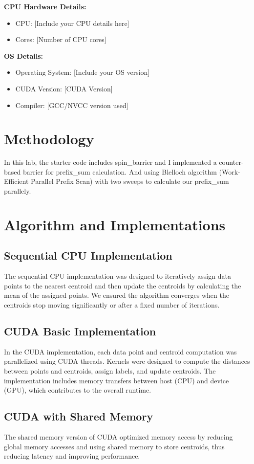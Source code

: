 \documentclass[letterpaper,12pt]{article}
\theoremstyle{remark}
\begin{document}
\textbf{CPU Hardware Details:}
\begin{itemize}
    \item CPU: [Include your CPU details here]
    \item Cores: [Number of CPU cores]
\end{itemize}

\textbf{OS Details:}
\begin{itemize}
    \item Operating System: [Include your OS version]
    \item CUDA Version: [CUDA Version]
    \item Compiler: [GCC/NVCC version used]
\end{itemize}
\section{Methodology}
In this lab, the starter code includes spin\_barrier and I implemented a counter-based barrier for prefix\_sum calculation. And using Blelloch algorithm (Work-Efficient Parallel Prefix Scan) with two sweeps to calculate our prefix\_sum parallely.\\

\section{Algorithm and Implementations}
\subsection{Sequential CPU Implementation}
The sequential CPU implementation was designed to iteratively assign data points to the nearest centroid and then update the centroids by calculating the mean of the assigned points. We ensured the algorithm converges when the centroids stop moving significantly or after a fixed number of iterations.

\subsection{CUDA Basic Implementation}
In the CUDA implementation, each data point and centroid computation was parallelized using CUDA threads. Kernels were designed to compute the distances between points and centroids, assign labels, and update centroids. The implementation includes memory transfers between host (CPU) and device (GPU), which contributes to the overall runtime.

\subsection{CUDA with Shared Memory}
The shared memory version of CUDA optimized memory access by reducing global memory accesses and using shared memory to store centroids, thus reducing latency and improving performance.
\end{document}
